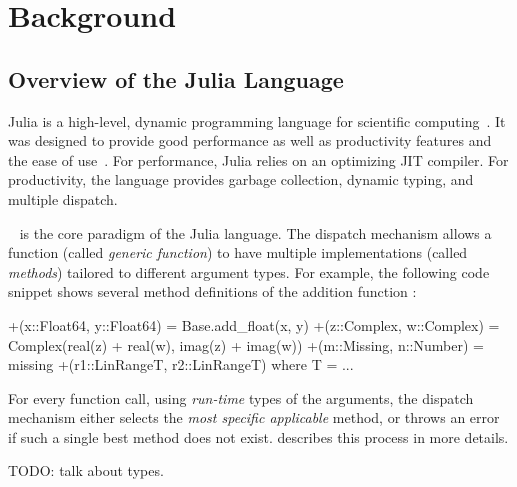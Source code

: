 \chapter{Background}

\section{Overview of the Julia Language}

Julia is a high-level, dynamic programming language for scientific computing~\cite{TODO}.
It was designed to provide good performance as well as productivity features and
the ease of use~\cite{TODO}.
For performance, Julia relies on an optimizing JIT compiler.
For productivity, the language provides garbage collection, dynamic typing, and
multiple dispatch. 

~\cite{TODO} is the core paradigm of the Julia
language. The dispatch mechanism allows a function (called \emph{generic
function}) to have multiple implementations (called \emph{methods}) tailored to
different argument types. For example, the following code snippet shows several
method definitions of the addition function \cjl{(+)}:
\begin{julia}
+(x::Float64, y::Float64) = Base.add_float(x, y)
+(z::Complex, w::Complex) = Complex(real(z) + real(w), imag(z) + imag(w))
+(m::Missing, n::Number)  = missing
+(r1::LinRange{T}, r2::LinRange{T}) where T = ...
\end{julia}
For every function call, using \emph{run-time} types of the arguments,
the dispatch mechanism either selects the \emph{most specific applicable} method,
or throws an error if such a single best method does not exist.
 describes this process in more details.

TODO: talk about types.

